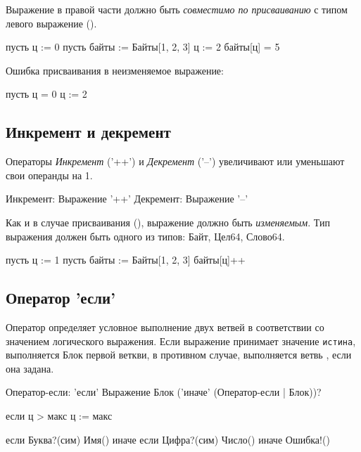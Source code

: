 \bigskip
Выражение в правой части должно быть \emph{совместимо по присваиванию} с типом левого выражение ().

\begin{Trivil}
пусть ц := 0
пусть байты := Байты[1, 2, 3]
ц := 2
байты[ц] = 5
\end{Trivil}

Ошибка присваивания в неизменяемое выражение:
\begin{SampleErr}[vspace=2pt]
пусть ц = 0
ц := 2
\end{SampleErr}

\hypertarget{inc-dec}{%
\subsection{Инкремент и декремент}\label{stmt:inc-dec}}

Операторы \emph{Инкремент} ('++') и \emph{Декремент} ('--') увеличивают или уменьшают свои операнды на 1. 

\begin{Grammar}
Инкремент: Выражение '++'
Декремент: Выражение '--'
\end{Grammar}

Как и в случае присваивания (), выражение должно быть \emph{изменяемым}.
Тип выражения должен быть одного из типов: Байт, Цел64, Слово64.

\begin{Trivil}
пусть ц := 1
пусть байты := Байты[1, 2, 3]
байты[ц]++
\end{Trivil}

\hypertarget{if-stmt}{%
\subsection{Оператор 'если'}\label{stmt:if-stmt}}

Оператор  определяет условное выполнение двух ветвей в соответствии со значением логического выражения. 
Если выражение принимает значение \verb+истина+, выполняется Блок первой веткви, в противном случае, выполняется ветвь , если она задана.

\begin{Grammar}
Оператор-если: 
    'если' Выражение Блок ('иначе' (Оператор-если | Блок))?
\end{Grammar}

\begin{Trivil}
если ц > макс { ц := макс }

если Буква?(сим) { Имя() }
иначе если Цифра?(сим) { Число() }
иначе { Ошибка!() }
\end{Trivil}

